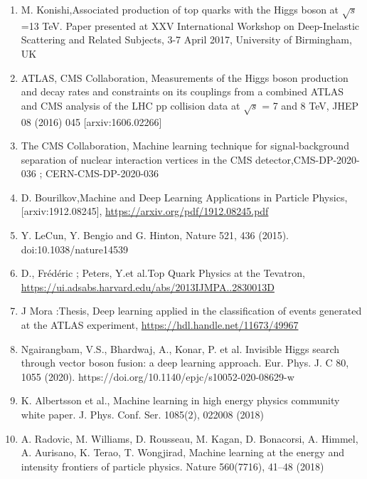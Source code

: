 

\begin{thebibliography}{9}

\begin{enumerate}
\item M. Konishi,Associated production of top quarks with the Higgs boson at $\sqrt{s}$ =13 TeV. Paper presented at XXV International Workshop on Deep-Inelastic Scattering and Related Subjects, 3-7 April 2017, University of Birmingham, UK 

\item ATLAS, CMS Collaboration, Measurements of the Higgs boson production and decay rates and constraints on its couplings from a combined ATLAS and CMS analysis of the LHC pp collision data at $\sqrt s$ = 7 and 8 TeV, JHEP 08 (2016) 045 [arxiv:1606.02266]
 
\item The CMS Collaboration, Machine learning technique for signal-background separation of nuclear interaction vertices in the CMS detector,CMS-DP-2020-036 ; CERN-CMS-DP-2020-036


\item D. Bourilkov,Machine and Deep Learning Applications in Particle Physics,
[arxiv:1912.08245], \url{https://arxiv.org/pdf/1912.08245.pdf}

\item Y. LeCun, Y. Bengio and G. Hinton, Nature 521, 436 (2015). doi:10.1038/nature14539


\item D., Frédéric ; Peters, Y.et al.Top Quark Physics at the Tevatron, \url{https://ui.adsabs.harvard.edu/abs/2013IJMPA..2830013D}

\item J Mora :Thesis, Deep learning applied in the classification of events generated at the ATLAS experiment, \url{https://hdl.handle.net/11673/49967}


\item Ngairangbam, V.S., Bhardwaj, A., Konar, P. et al. Invisible Higgs search through vector boson fusion: a deep learning approach. Eur. Phys. J. C 80, 1055 (2020). https://doi.org/10.1140/epjc/s10052-020-08629-w

\item  K. Albertsson et al., Machine learning in high energy physics community white paper. J. Phys. Conf. Ser. 1085(2), 022008 (2018)

\item A. Radovic, M. Williams, D. Rousseau, M. Kagan, D. Bonacorsi,
A. Himmel, A. Aurisano, K. Terao, T. Wongjirad, Machine learning at the energy and intensity frontiers of particle physics. Nature
560(7716), 41–48 (2018)


\end{enumerate}
\end{thebibliography}

